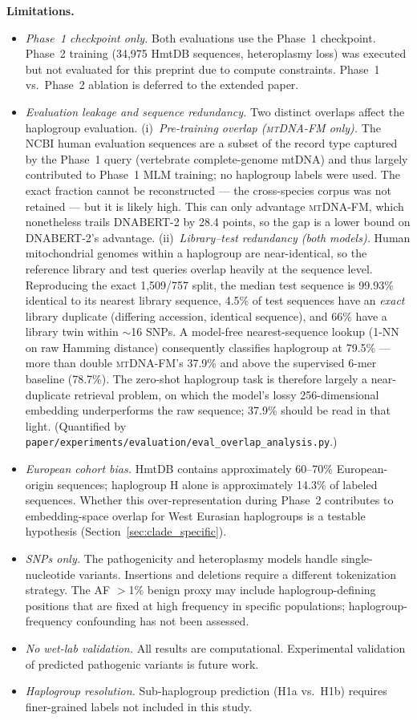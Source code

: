 \documentclass[10pt]{article}
\newcommand{\mtdnafm}{\textsc{mtDNA-FM}\xspace}
\begin{document}
\textbf{Limitations.}
\begin{itemize}
\item \textit{Phase~1 checkpoint only.} Both evaluations use the Phase~1 checkpoint. Phase~2
training (34,975 HmtDB sequences, heteroplasmy loss) was executed but not evaluated for this
preprint due to compute constraints. Phase~1 vs.\ Phase~2 ablation is deferred to the extended
paper.
\item \textit{Evaluation leakage and sequence redundancy.} Two distinct overlaps affect the
haplogroup evaluation. (i)~\emph{Pre-training overlap (\mtdnafm{} only).} The NCBI human
evaluation sequences are a subset of the record type captured by the Phase~1 query (vertebrate
complete-genome mtDNA) and thus largely contributed to Phase~1 MLM training; no haplogroup labels
were used. The exact fraction cannot be reconstructed --- the cross-species corpus was not retained
--- but it is likely high. This can only advantage \mtdnafm{}, which nonetheless trails DNABERT-2
by 28.4 points, so the gap is a lower bound on DNABERT-2's advantage. (ii)~\emph{Library--test
redundancy (both models).} Human mitochondrial genomes within a haplogroup are near-identical, so
the reference library and test queries overlap heavily at the sequence level. Reproducing the exact
1,509/757 split, the median test sequence is 99.93\% identical to its nearest library sequence,
4.5\% of test sequences have an \emph{exact} library duplicate (differing accession, identical
sequence), and 66\% have a library twin within $\sim$16 SNPs. A model-free nearest-sequence lookup
(1-NN on raw Hamming distance) consequently classifies haplogroup at 79.5\% --- more than double
\mtdnafm{}'s 37.9\% and above the supervised 6-mer baseline (78.7\%). The zero-shot haplogroup task
is therefore largely a near-duplicate retrieval problem, on which the model's lossy 256-dimensional
embedding underperforms the raw sequence; 37.9\% should be read in that light. (Quantified by
\texttt{paper/experiments/evaluation/eval\_overlap\_analysis.py}.)
\item \textit{European cohort bias.} HmtDB contains approximately 60--70\% European-origin
sequences; haplogroup H alone is approximately 14.3\% of labeled sequences. Whether this
over-representation during Phase~2 contributes to embedding-space overlap for West Eurasian
haplogroups is a testable hypothesis (Section~\ref{sec:clade_specific}).
\item \textit{SNPs only.} The pathogenicity and heteroplasmy models handle single-nucleotide
variants. Insertions and deletions require a different tokenization strategy. The AF $>$1\%
benign proxy may include haplogroup-defining positions that are fixed at high frequency in
specific populations; haplogroup-frequency confounding has not been assessed.
\item \textit{No wet-lab validation.} All results are computational. Experimental validation of
predicted pathogenic variants is future work.
\item \textit{Haplogroup resolution.} Sub-haplogroup prediction (H1a vs.\ H1b) requires
finer-grained labels not included in this study.
\end{itemize}
\end{document}
